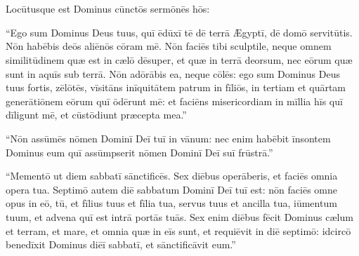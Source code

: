 \chapter{}


\thispagestyle{empty}

Locūtusque est Dominus cūnctōs sermōnēs hōs: 

``Ego sum Dominus Deus
tuus, quī ēdūxī tē dē terrā Ægyptī, dē domō servitūtis.  Nōn habēbis deōs
aliēnōs cōram mē. Nōn faciēs tibi sculptile, neque omnem
similitūdinem quæ est in cælō dēsuper, et
quæ in terrā deorsum, nec eōrum quæ sunt in aquīs sub terrā. 
Nōn adōrābis
ea, neque cōlēs: ego sum Dominus Deus tuus fortis,
zēlōtēs, vīsitāns
inīquitātem patrum in fīliōs, in tertiam et quārtam
generātiōnem eōrum quī ōdērunt mē:
et faciēns misericordiam in mīllia hīs quī dīligunt mē, et cūstōdiunt
præcepta mea.''

``Nōn assūmēs nōmen
Dominī Deī tuī in vānum: nec enim habēbit
īnsontem Dominus eum quī assūmpserit nōmen Dominī Deī suī
frūstrā.'' 

``Mementō ut diem sabbatī
sānctificēs. 
Sex diēbus operāberis, et
faciēs omnia opera tua. 
Septimō autem diē sabbatum Dominī Deī tuī est:
nōn faciēs omne opus in eō, tū, et fīlius tuus et fīlia tua, servus tuus et
ancilla tua, iūmentum tuum, et advena quī est intrā portās
tuās. 
Sex enim diēbus fēcit Dominus cælum et terram, et mare, et omnia
quæ in eīs sunt, et requiēvit in diē septimō: idcircō benedīxit Dominus diēī
sabbatī, et sānctificāvit eum.''

